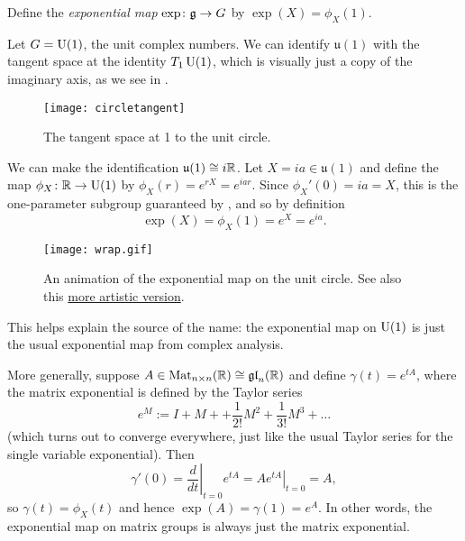 \begin{definition}\label{def:exponential map}
	Define the \emph{exponential map} $\exp \colon\thinspace\! \mathfrak{g} \to G$ by $\exp(X) = \phi_X(1)$.
\end{definition}

\begin{example}
	Let $G = \operatorname{U}(1)$, the unit complex numbers. We can identify $\mathfrak{u}(1)$ with the tangent space at the identity $T_1 \operatorname{U}(1)$, which is visually just a copy of the imaginary axis, as we see in .
	
	\begin{figure}[htbp]
		\centering
			\texttt{[image: circletangent]}
		\caption{The tangent space at 1 to the unit circle.}
		\label{fig:circletangent}
	\end{figure}
	
	We can make the identification $\mathfrak{u}(1) \cong i \mathbb{R}$. Let $X = i a \in \mathfrak{u}(1)$ and define the map $\phi_X \colon\thinspace\! \mathbb{R} \to \operatorname{U}(1)$ by $\phi_X(r) = e^{rX} = e^{i a r}$. Since $\phi_X'(0) = ia = X$, this is the one-parameter subgroup guaranteed by , and so by definition
	\[
		\exp(X) = \phi_X(1) = e^X = e^{ia}.
	\]
	
	\ifplastex
	\begin{figure}[htbp]
		\centering
			\texttt{[image: wrap.gif]}
		\caption{An animation of the exponential map on the unit circle. See also this \href{https://community.wolfram.com/groups/-/m/t/2148879}{more artistic version}.}
		\label{fig:wrap}
	\end{figure}
	\fi
	
	This helps explain the source of the name: the exponential map on $\operatorname{U}(1)$ is just the usual exponential map from complex analysis.
\end{example}

More generally, suppose $A \in \operatorname{Mat}_{n\times n}(\mathbb{R}) \cong \mathfrak{gl}_n(\mathbb{R})$ and define $\gamma(t) = e^{tA}$, where the matrix exponential is defined by the Taylor series
\[
	e^M := I + M + + \frac{1}{2!} M^2 + \frac{1}{3!} M^3 + \dots
\]
(which turns out to converge everywhere, just like the usual Taylor series for the single variable exponential). Then
\[
	\gamma'(0) = \left. \frac{d}{dt} \right|_{t=0} e^{tA} = \left. A e^{tA} \right|_{t=0} = A,
\]
so $\gamma(t) = \phi_X(t)$ and hence $\exp(A) = \gamma(1) = e^A$. In other words, the exponential map on matrix groups is always just the matrix exponential.


